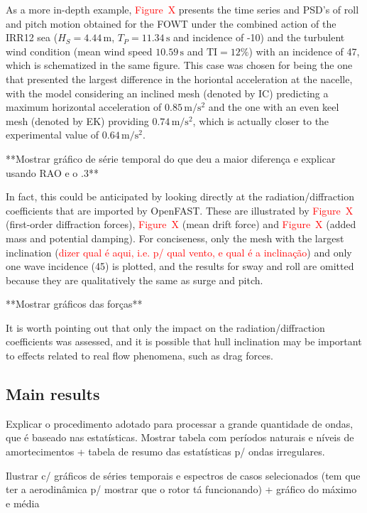 As a more in-depth example, \textcolor{red}{Figure~X} presents the time series and PSD's of roll and pitch motion obtained for the FOWT under the combined action of the IRR12 sea ($H_S=4.44\,\text{m}$, $T_P = 11.34\,\text{s}$ and incidence of -10\textdegree{}) and the turbulent wind condition (mean wind speed $10.59\,\text{s}$ and $\textrm{TI}=12\%$) with an incidence of 47\textdegree{}, which is schematized in the same figure. This case was chosen for being the one that presented the largest difference in the horiontal acceleration at the nacelle, with the model considering an inclined mesh (denoted by IC) predicting a maximum horizontal acceleration of $0.85\,\text{m}/\text{s}^2$ and the one with an even keel mesh (denoted by EK) providing $0.74\,\text{m}/\text{s}^2$, which is actually closer to the experimental value of $0.64\,\text{m}/\text{s}^2$. 

**Mostrar gráfico de série temporal do que deu a maior diferença e explicar usando RAO e o .3**

In fact, this could be anticipated by looking directly at the radiation/diffraction coefficients that are imported by OpenFAST. These are illustrated by \textcolor{red}{Figure~X} (first-order diffraction forces), \textcolor{red}{Figure~X} (mean drift force) and \textcolor{red}{Figure~X} (added mass and potential damping). For conciseness, only the mesh with the largest inclination (\textcolor{red}{dizer qual é aqui, i.e. p/ qual vento, e qual é a inclinação}) and only one wave incidence (45\textdegree{}) is plotted, and the results for sway and roll are omitted because they are qualitatively the same as surge and pitch.

**Mostrar gráficos das forças**

It is worth pointing out that only the impact on the radiation/diffraction coefficients was assessed, and it is possible that hull inclination may be important to effects related to real flow phenomena, such as drag forces.


\subsection{Main results} \label{subsec:exp_vs_num:main_results}
Explicar o procedimento adotado para processar a grande quantidade de ondas, que é baseado nas estatísticas.
Mostrar tabela com períodos naturais e níveis de amortecimentos + tabela de resumo das estatísticas p/ ondas irregulares.

Ilustrar c/ gráficos de séries temporais e espectros de casos selecionados (tem que ter a aerodinâmica p/ mostrar que o rotor tá funcionando) + gráfico do máximo e média


